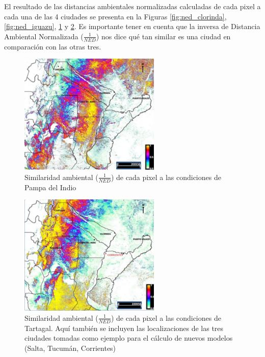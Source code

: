   \par El resultado de las distancias ambientales normalizadas calculadas de
    cada pixel a cada una de las 4 ciudades se presenta en la Figuras
    \ref{fig:ned_clorinda}, \ref{fig:ned_iguazu}, \ref{fig:ned_pampa} y
    \ref{fig:ned_tartagal}. Es importante tener en cuenta que la inversa de Distancia Ambiental
    Normalizada ($\frac{1}{NED}$) nos dice qué tan similar es una ciudad en
    comparación con las otras tres.
    \begin{figure}[hbt]
      \centering%
      \includegraphics[width=0.6\textwidth]{images/ned_pampa}%
      \caption{Similaridad ambiental ($\frac{1}{NED}$)
              de cada pixel a las condiciones de Pampa del Indio}\label{fig:ned_pampa}
    \end{figure}


    \begin{figure}[hbt]
      \centering%
      \includegraphics[width=0.6\textwidth]{images/ned_tartagal}%
      \caption{Similaridad ambiental ($\frac{1}{NED}$)
              de cada pixel a las condiciones de Tartagal.
              Aquí también se incluyen las localizaciones de las tres ciudades
              tomadas como ejemplo para el cálculo de nuevos modelos
              (Salta, Tucumán, Corrientes)}\label{fig:ned_tartagal}
    \end{figure}

